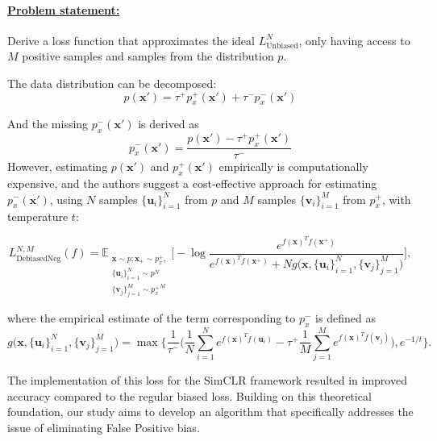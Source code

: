 \documentclass{article}
\begin{document}
\paragraph{\underline{Problem statement:}} Derive a loss function that approximates the ideal $L_{\text{Unbiased}}^N$, only having access to $M$ positive samples and samples from the distribution $p$.

The data distribution can be decomposed:
\begin{equation} \label{eq:4}
p(\textbf{x}') = \tau^+ p^+_x(\textbf{x}') + \tau^-p_x^-(\textbf{x}')
\end{equation}

And the missing $p^-_x(\textbf{x}')$ is derived as
\begin{equation} \label{eq:5}
p_x^-(\textbf{x}') = \frac{p(\textbf{x}') - \tau^+ p^+_x(\textbf{x}')}{\tau^-}
\end{equation}
However, estimating $p(\textbf{x}')$ and $p^+_x(\textbf{x}')$ empirically is computationally expensive, and the authors suggest a cost-effective approach for estimating $p^-_x(\textbf{x}')$, using $N$ samples $\{\textbf{u}_i\}_{i=1}^N$ from $p$ and $M$ samples $\{\textbf{v}_i\}_{i=1}^M$ from $p_x^+$, with temperature $t$:

\begin{equation} \label{eq:6}
L_{\text{DebiasedNeg}}^{N, M} (f) = \mathbb{E}_{\substack{\textbf{x} \sim p; \textbf{x}_+ \sim p_x^+,\\ \{\textbf{u}_i\}_{i=1}^N \sim p^N \\ \{\textbf{v}_j\}_{j=1}^M \sim {p_x^+}^M}}  \bigg[ -\log \frac{e^{f(\textbf{x})^T f(\textbf{x}^+)} }{e^{f(\textbf{x})^T f(\textbf{x}^+)} + N g\big(\textbf{x}, \{\textbf{u}_i\}_{i=1}^N, \{\textbf{v}_j\}_{j=1}^M\big)} \bigg],
\end{equation}

where the empirical estimate of the term corresponding to $p_x^-$ is defined as
\begin{equation} \label{eq:7}
g\big(\textbf{x}, \{\textbf{u}_i\}_{i=1}^N, \{\textbf{v}_j\}_{j=1}^M\big) = \max \bigg\{ \frac{1}{\tau^-}\bigg(\frac{1}{N} \sum \limits_{i=1}^N e^{f(\textbf{x})^T f(\textbf{u}_i)} - \tau^+ \frac{1}{M} \sum \limits_{j=1}^M e^{f(\textbf{x})^T f(\textbf{v}_j)}\bigg), e^{-1/t}\bigg\}.
\end{equation}

The implementation of this loss for the SimCLR framework resulted in improved accuracy compared to the regular biased loss. Building on this theoretical foundation, our study aims to develop an algorithm that specifically addresses the issue of eliminating False Positive bias.
\end{document}
